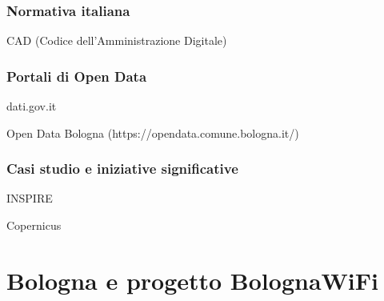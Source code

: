 \subsubsection{Normativa italiana}
CAD (Codice dell'Amministrazione Digitale)

\subsubsection{Portali di Open Data}
dati.gov.it

Open Data Bologna (https://opendata.comune.bologna.it/)

\subsubsection{Casi studio e iniziative significative}
INSPIRE

Copernicus


\section{Bologna e progetto BolognaWiFi}  %

